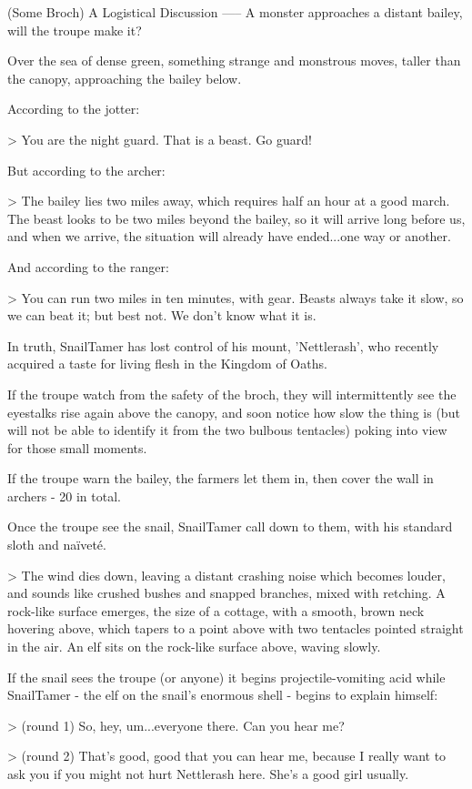 (Some Broch) A Logistical Discussion
-----
{A monster approaches a distant bailey, will the troupe make it?}

Over the sea of dense green, something strange and monstrous moves, taller than the canopy, approaching the bailey below.

According to the \gls{jotter}:

> You are the night guard.  That is a beast.  Go guard!

But according to the archer:

> The bailey lies two miles away, which requires half an hour at a good march.  The beast looks to be two miles beyond the bailey, so it will arrive long before us, and when we arrive, the situation will already have ended...one way or another.

And according to the ranger:

> You can run two miles in ten minutes, with gear.  Beasts always take it slow, so we can beat it; but best not.  We don't know what it is.

In truth, SnailTamer has lost control of his mount, 'Nettlerash', who recently acquired a taste for living flesh in the Kingdom of Oaths.

If the troupe watch from the safety of the broch,
they will intermittently see the eyestalks rise again above the canopy, and soon notice how slow the thing is (but will not be able to identify it from the two bulbous tentacles) poking into view for those small moments.

If the troupe warn the bailey,
the farmers let them in, then cover the wall in archers - 20 in total.

Once the troupe see the snail,
SnailTamer call down to them, with his standard sloth and naïveté.

> The wind dies down, leaving a distant crashing noise which becomes louder, and sounds like crushed bushes and snapped branches, mixed with  retching.  A rock-like surface emerges, the size of a cottage, with a smooth, brown neck hovering above, which tapers to a point above with two tentacles pointed straight in the air.  An elf sits on the rock-like surface above, waving slowly.

If the snail sees the troupe (or anyone) it begins projectile-vomiting acid while SnailTamer - the elf on the snail's enormous shell - begins to explain himself:

> (round 1) So, hey, um...everyone there.  Can you hear me?

> (round 2) That's good, good that you can hear me, because I really want to ask you if you might not hurt Nettlerash here.  She's a good girl usually.


